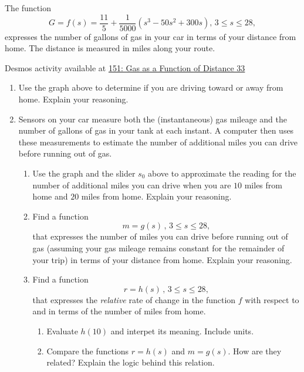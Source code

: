 \documentclass{ximera}
\begin{document}
\begin{question} \label{Qjjjkmmmadgt4e}
The function 
\[
   G = f(s) = \frac{11}{5} +\frac{1}{5000}\left( s^3-50s^2+300s \right) , \, 3\leq s \leq 28 ,
\]
expresses the number of gallons of gas in your car in terms of your distance from home. The distance is measured in miles along your route. 

\begin{onlineOnly}
    \begin{center}
\end{center}
\end{onlineOnly}

Desmos activity available at
\href{https://www.desmos.com/calculator/pb8v4t3cxg}{151: Gas as a Function of Distance 33}

\begin{enumerate}
\item Use the graph above to determine if you are driving toward or away from home. Explain your reasoning.

\item Sensors on your car measure both the (instantaneous) gas mileage and the number of gallons of gas in your tank at each instant. A computer then uses these measurements to estimate the number of additional miles you can drive before running out of gas.

\begin{enumerate}

\item Use the graph and the slider $s_0$ above to approximate the reading for the number of additional miles you can drive when you are $10$ miles from home and $20$ miles from home. Explain your reasoning.

\item Find a function 
\[
  m =g(s) \, , \, 3\leq s \leq 28 ,
\]
that expresses the number of miles you can drive before running out of gas (assuming your gas mileage remains constant for the remainder of your trip) in terms of your distance from home. Explain your reasoning. 

\item Find a function 
\[
     r = h(s) \, , \, 3\leq s \leq 28 ,
\]
that expresses the \emph{relative} rate of change in the function $f$ with respect to and in terms of the number of miles from home. 

\begin{enumerate}
\item Evaluate $h(10)$ and interpet its meaning. Include units.

\item Compare the functions $r=h(s)$ and $m=g(s)$. How are they related? Explain the logic behind this relation.
\end{enumerate}

\end{enumerate}
\end{enumerate}

\end{question}
\end{document}
